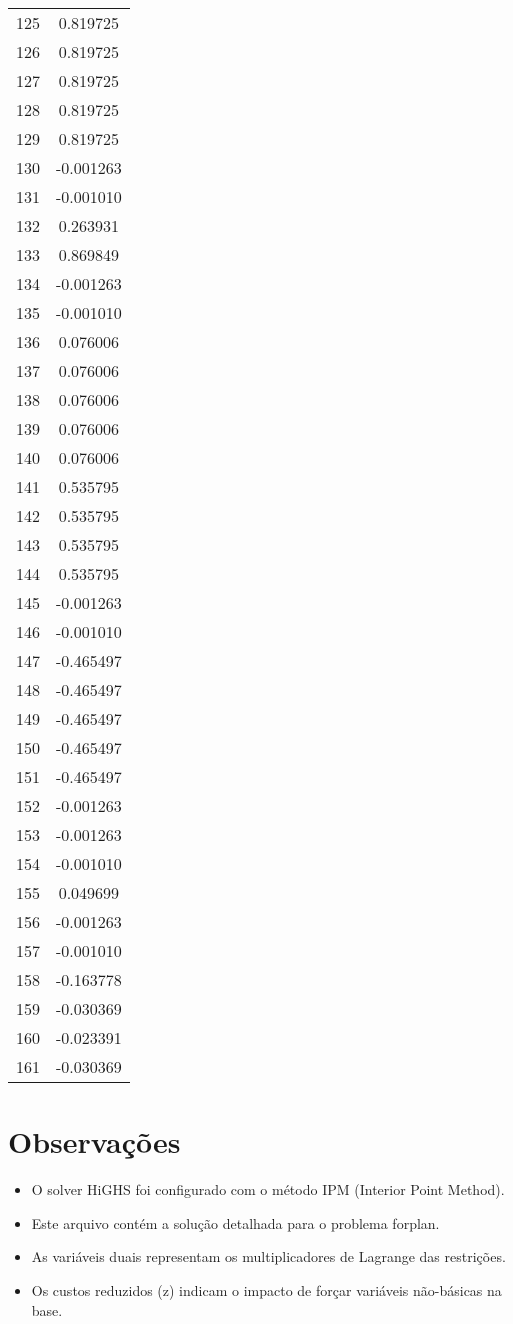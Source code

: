 \documentclass[12pt]{article}
\begin{document}
\begin{longtable}{@{}cc@{}}
125 & 0.819725 \\
126 & 0.819725 \\
127 & 0.819725 \\
128 & 0.819725 \\
129 & 0.819725 \\
130 & -0.001263 \\
131 & -0.001010 \\
132 & 0.263931 \\
133 & 0.869849 \\
134 & -0.001263 \\
135 & -0.001010 \\
136 & 0.076006 \\
137 & 0.076006 \\
138 & 0.076006 \\
139 & 0.076006 \\
140 & 0.076006 \\
141 & 0.535795 \\
142 & 0.535795 \\
143 & 0.535795 \\
144 & 0.535795 \\
145 & -0.001263 \\
146 & -0.001010 \\
147 & -0.465497 \\
148 & -0.465497 \\
149 & -0.465497 \\
150 & -0.465497 \\
151 & -0.465497 \\
152 & -0.001263 \\
153 & -0.001263 \\
154 & -0.001010 \\
155 & 0.049699 \\
156 & -0.001263 \\
157 & -0.001010 \\
158 & -0.163778 \\
159 & -0.030369 \\
160 & -0.023391 \\
161 & -0.030369 \\

\end{longtable}


\section{Observações}

\begin{itemize}
\item O solver HiGHS foi configurado com o método IPM (Interior Point Method).
\item Este arquivo contém a solução detalhada para o problema forplan.
\item As variáveis duais representam os multiplicadores de Lagrange das restrições.
\item Os custos reduzidos (z) indicam o impacto de forçar variáveis não-básicas na base.
\end{itemize}
\end{document}
